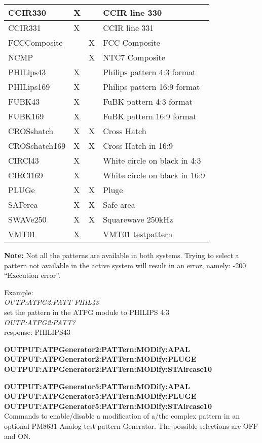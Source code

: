 \begin{tabular}{|l|l|l|l|}
CCIR330		& X			&				& CCIR line 330\\ \hline
CCIR331		& X			&				& CCIR line 331\\ \hline
FCCComposite	&		& X			& FCC Composite\\ \hline
NCMP			&				& X			& NTC7 Composite\\ \hline
PHILips43	& X			&				& Philips pattern 4:3 format\\ \hline
PHILips169	& X		&				& Philips pattern 16:9 format\\ \hline
FUBK43		&	X			&				& FuBK pattern 4:3 format\\ \hline
FUBK169		& X			&				& FuBK pattern 16:9 format\\ \hline
CROSshatch	& X		& X			& Cross Hatch\\ \hline
CROSshatch169	& X	& X			& Cross Hatch in 16:9\\ \hline
CIRCl43		& X			&				& White circle on black in 4:3\\ \hline
CIRCl169	& X			& 			&	White circle on black in 16:9\\ \hline
PLUGe			& X			& X			& Pluge\\ \hline
SAFerea		& X			& X			& Safe area\\ \hline
SWAVe250	& X			& X			& Squarewave 250kHz\\ \hline
VMT01			& X			&				& VMT01 testpattern\\ \hline
\end{tabular}

\textbf{Note:} Not all the patterns are available in both systems. Trying to select a pattern not available in the active system will result in an error, namely: -200, ``Execution error''.

Example:\\
\textit{OUTP:ATPG2:PATT PHIL43}\\
set the pattern in the ATPG module to PHILIPS 4:3\\
\textit{OUTP:ATPG2:PATT?}\\
response: PHILIPS43

\textbf{OUTPUT:ATPGenerator2:PATTern:MODify:APAL}\\
\textbf{OUTPUT:ATPGenerator2:PATTern:MODify:PLUGE}\\
\textbf{OUTPUT:ATPGenerator2:PATTern:MODify:STAircase10}

\textbf{OUTPUT:ATPGenerator5:PATTern:MODify:APAL}\\
\textbf{OUTPUT:ATPGenerator5:PATTern:MODify:PLUGE}\\
\textbf{OUTPUT:ATPGenerator5:PATTern:MODify:STAircase10}\\
Commands to enable/disable a modification of a/the complex pattern in an optional PM8631 Analog test pattern Generator. The possible selections are OFF and ON.

